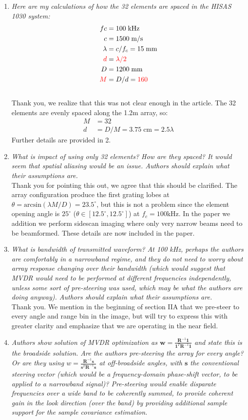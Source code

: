 \documentclass[11pt]{article} %
\newcommand\T{^{\scriptscriptstyle T}}
\renewcommand\vec[1]{\boldsymbol{#1}}
\newcommand\mat[1]{\boldsymbol{#1}}
\newcommand\1{\vec 1}
\newcommand*\s{\vec s}
\newcommand*\w{\vec w}
\newcommand*\R{\mat R}
\newcommand*\Ri{\R^{-1}}
\renewcommand*\t{^T}
\newcommand\q[1]{\textit{#1}}
\newcommand\qi[1]{\item\q{#1}}
\newcommand\ans[1]{#1}
\newcommand\ai[1]{\\[.5\baselineskip]\ans{#1}}
\begin{document}
\begin{enumerate}
\qi{Here are my calculations of how the 32 elements are spaced in the HISAS 1030 system:}
\begin{align}
fc &= 100\;\text{kHz} \\
c  &= 1500\;\text{m/s} \\
\lambda &= c/f_c = 15\;\text{mm} \\
\textcolor{red}{ d } &= \textcolor{red}{\lambda/2 } \\
D &= 1200\;\text{mm} \\
\textcolor{red}{M} &= D/d = \textcolor{red}{160}
\end{align}
\ai{Thank you, we realize that this was not clear enough in the article. The 32 elements are evenly spaced along the 1.2m array, so:
\begin{align}
M &= 32 \\
d &= D / M = 3.75\;\text{cm} = 2.5\lambda
\end{align}
Further details are provided in 2.}
%
\qi{What is impact of using only 32 elements? How are they spaced? It would seem that spatial aliasing would be an issue. Authors should explain what their assumptions are.}
\ai{Thank you for pointing this out, we agree that this should be clarified. The array configuration produce the first grating lobes at $\theta = \text{arcsin}(\lambda M/D) = 23.5^\circ$, but this is not a problem since the element opening angle is $25^\circ$ ($\theta\in[12.5^\circ,12.5^\circ]$) at $f_c=100$\;kHz. In the paper we addition we perform sidescan imaging where only very narrow beams need to be beamformed. These details are now included in the paper.}
%
\qi{What is bandwidth of transmitted waveform? At 100 kHz, perhaps the authors are comfortably in a narrowband regime, and they do not need to worry about array response changing over their bandwidth (which would suggest that MVDR would need to be performed at different frequencies independently, unless some sort of pre-steering was used, which may be what the authors are doing anyway). Authors should explain what their assumptions are.}
\ai{Thank you. We mention in the beginning of section IIA that we pre-steer to every angle and range bin in the image, but will try to express this with greater clarity and emphasize that we are operating in the near field.}
%
\qi{Authors show solution of MVDR optimization as $\w = \frac{\Ri\1}{\1\T\Ri\1}$ and state this is the broadside solution. Are the authors pre-steering the array for every angle? Or are they using $w = \frac{\Ri\s}{\s\t\Ri\s}$ at off-broadside angles, with $\s$ the conventional steering vector (which would be a frequency-domain phase-shift vector, to be applied to a narrowband signal)? Pre-steering would enable disparate frequencies over a wide band to be coherently summed, to provide coherent gain in the look direction (over the band) by providing additional sample support for the sample covariance estimation.}

\end{enumerate}
\end{document}
